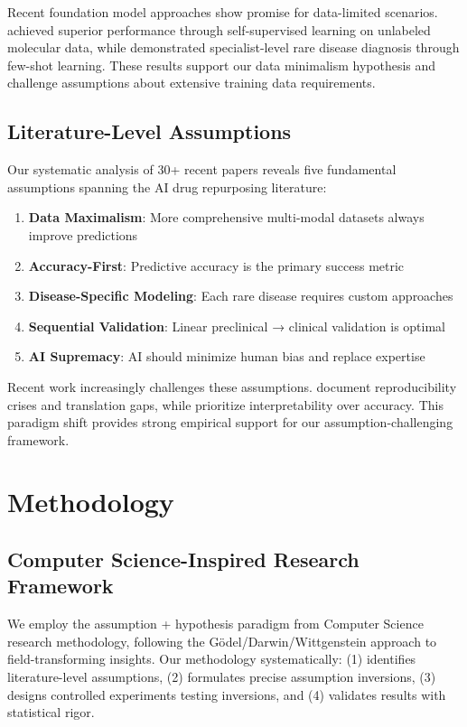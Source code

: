 \documentclass{article}
\begin{document}
Recent foundation model approaches show promise for data-limited scenarios. \citet{videomol_2024} achieved superior performance through self-supervised learning on unlabeled molecular data, while \citet{rarebench_2024} demonstrated specialist-level rare disease diagnosis through few-shot learning. These results support our data minimalism hypothesis and challenge assumptions about extensive training data requirements.

\subsection{Literature-Level Assumptions}

Our systematic analysis of 30+ recent papers reveals five fundamental assumptions spanning the AI drug repurposing literature:

\begin{enumerate}
\item \textbf{Data Maximalism}: More comprehensive multi-modal datasets always improve predictions
\item \textbf{Accuracy-First}: Predictive accuracy is the primary success metric 
\item \textbf{Disease-Specific Modeling}: Each rare disease requires custom approaches
\item \textbf{Sequential Validation}: Linear preclinical → clinical validation is optimal
\item \textbf{AI Supremacy}: AI should minimize human bias and replace expertise
\end{enumerate}

Recent work increasingly challenges these assumptions. \citet{hasselgren_oprea_2023} document reproducibility crises and translation gaps, while \citet{kg_explainable_rare_2024} prioritize interpretability over accuracy. This paradigm shift provides strong empirical support for our assumption-challenging framework.

\section{Methodology}

\subsection{Computer Science-Inspired Research Framework}

We employ the assumption + hypothesis paradigm from Computer Science research methodology, following the Gödel/Darwin/Wittgenstein approach to field-transforming insights. Our methodology systematically: (1) identifies literature-level assumptions, (2) formulates precise assumption inversions, (3) designs controlled experiments testing inversions, and (4) validates results with statistical rigor.
\end{document}
